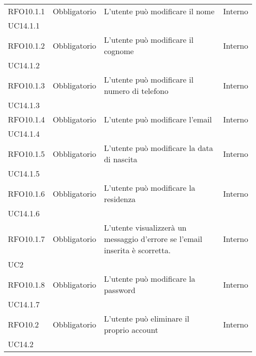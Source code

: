 \begin{longtable}{ >{\centering}p{} >{\centering}p{}
		>{\raggedright}p{} >{\centering}p{}}
	RFO10.1.1	&	Obbligatorio	&	L'utente può modificare il nome	&	Interno \\ UC14.1.1	\tabularnewline
	RFO10.1.2	&	Obbligatorio	&	L'utente può modificare il cognome	&	Interno \\ UC14.1.2	\tabularnewline
	RFO10.1.3	&	Obbligatorio	&	L'utente può modificare il numero di telefono 	&	Interno \\ UC14.1.3	\tabularnewline
	RFO10.1.4	&	Obbligatorio	&	L'utente può modificare l'email	&	Interno \\ UC14.1.4	\tabularnewline
	RFO10.1.5	&	Obbligatorio	&	L'utente può modificare la data di nascita	&	Interno \\ UC14.1.5	\tabularnewline
	RFO10.1.6	&	Obbligatorio	&	L'utente può modificare la residenza	&	Interno  \\ UC14.1.6	\tabularnewline
	RFO10.1.7	&	Obbligatorio	&	L'utente visualizzerà un messaggio d'errore se l'email inserita è scorretta.	&	Interno \\ UC2	\tabularnewline
	RFO10.1.8	&	Obbligatorio	&	L'utente può modificare la password	&	Interno  \\ UC14.1.7	\tabularnewline
	RFO10.2	&	Obbligatorio	&	L'utente può eliminare il proprio account	&	Interno  \\ UC14.2	\tabularnewline
	

\end{longtable}

